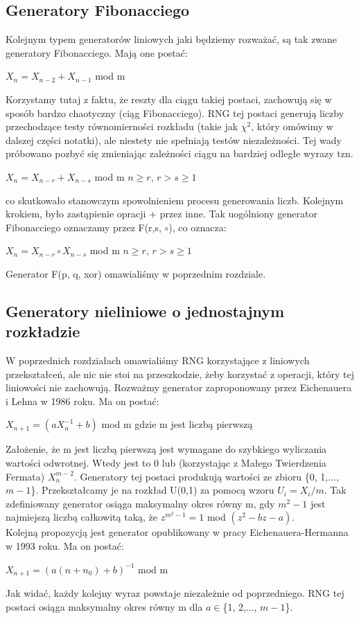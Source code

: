\documentclass[a4paper]{scrartcl}
\begin{document}
\subsection{Generatory Fibonacciego}
\null\qquad Kolejnym typem generatorów liniowych jaki będziemy rozważać, są tak zwane generatory Fibonacciego. Mają one postać:
\begin{center}
$X_n=X_{n-2}+X_{n-1}$ mod m
\end{center}
Korzystamy tutaj z faktu, że reszty dla ciągu takiej postaci, zachowują się w sposób bardzo chaotyczny (ciąg Fibonacciego).
RNG tej postaci generują liczby przechodzące testy równomierności rozkładu (takie jak $\chi^2$, który omówimy w dalszej części notatki), ale niestety nie spełniają testów niezależności. Tej wady próbowano pozbyć się zmieniając zależności ciągu na bardziej odległe wyrazy tzn.
\begin{center}
$X_n=X_{n-r}+X_{n-s}$ mod m $n\geq r$, $r>s\geq 1$
\end{center}
co skutkowało stanowczym spowolnieniem procesu generowania liczb. Kolejnym krokiem, było zastąpienie opracji + przez inne. Tak uogólniony generator Fibonacciego oznaczamy przez F(r,s, $\circ$), co oznacza:
\begin{center}
$X_n=X_{n-r} \circ X_{n-s}$ mod m $n\geq r$, $r>s\geq 1$
\end{center}
Generator F(p, q, xor) omawialiśmy w poprzednim rozdziale.
\subsection{Generatory nieliniowe o jednostajnym rozkładzie}
W poprzednich rozdziałach omawialiśmy RNG korzystające z liniowych przekształceń, ale nic nie stoi na przeszkodzie, żeby korzystać z operacji, który tej liniowości nie zachowują. Rozważmy generator zaproponowany przez Eichenauera i Lehna w 1986 roku. Ma on postać:
\begin{center}
$X_{n+1}=(aX_n^{-1} + b)$ mod m gdzie m jest liczbą pierwszą
\end{center}
Założenie, że m jest liczbą pierwszą jest wymagane do szybkiego wyliczania wartości odwrotnej. Wtedy jest to 0 lub (korzystając z Małego Twierdzenia Fermata) $X_n^{m-2}$. Generatory tej postaci produkują wartości ze zbioru \{0, 1,..., $m-1$\}. Przekształcamy je na rozkład U(0,1) za pomocą wzoru $U_i=X_i/m$. Tak zdefiniowany generator osiąga maksymalny okres równy m, gdy $m^2-1$ jest najmiejszą liczbą całkowitą taką, że $z^{m^2-1} = 1$ mod $(z^2 - bz - a)$.\\
\null\qquad Kolejną propozycją jest generator opublikowany w pracy Eichenauera-Hermanna w 1993 roku. Ma on postać:
\begin{center}
$X_{n+1}=(a(n+n_0) + b)^{-1}$ mod m
\end{center}
Jak widać, każdy kolejny wyraz powstaje niezależnie od poprzedniego. RNG tej postaci osiąga maksymalny okres równy m dla $a\in$\{1, 2,..., $m-1$\}.
\end{document}
